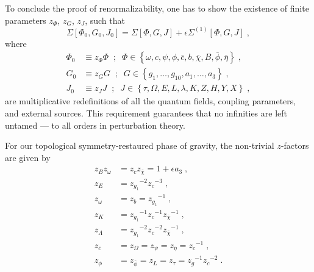 \documentclass[../main.tex]{subfiles}
\begin{document}
To conclude the proof of renormalizability, one has to show the existence of finite parameters $ z_{ \Phi } $, $ z_{ G } $, $ z_{ J } $, such that
\begin{equation}
  \label{eq:multiplicative-renorm}
  \Sigma \left[ \Phi_0, G_0, J_0 \right] = \Sigma \left[ \Phi, G, J \right] + \epsilon\Sigma^{ (1) } \left[ \Phi, G, J \right] \;,
\end{equation}
where
\begin{subequations}%
  \label{eq:field-redef}
  \begin{align}
    \Phi_0 & \equiv z_{ \Phi } \Phi \;\; ; \;\; \Phi \in \left\{ \omega, c, \psi, \phi, \bar{ c }, b, \bar{ \chi }, B, \bar{ \phi }, \bar{ \eta } \right\} \;, \\
    G_0    & \equiv z_{ G } G \;\; ; \;\; G \in \left\{ g_1, \ldots, g_{10}, a_1, \ldots, a_3 \right\} \;,                                                     \\
    J_0    & \equiv z_{ J } J \;\; ; \;\; J \in \left\{ \tau, \Omega, E, L, \lambda, K, Z, H, Y, X \right\} \;,
  \end{align}
\end{subequations}
are multiplicative redefinitions of all the quantum fields, coupling parameters, and external sources. This requirement guarantees that no infinities are left untamed --- to all orders in perturbation theory.

For our topological symmetry-restaured phase of gravity, the non-trivial $z$-factors are given by
\begin{subequations}%
  \label{eq:z-factors}
  \begin{align}
    z_B z_{ \omega } & = z_c z_{\bar{\chi}} = 1 + \epsilon a_3 \;,                \\
    z_E              & = {z_{g_1}}^{-2} {z_c}^{-3} \;,                            \\
    z_{ \omega }     & = z_b = {z_{g_1}}^{-1} \;,                                 \\
    z_K              & = {z_{ g_1 }}^{-1} {z_c}^{-1} {z_{\bar{\chi}}}^{-1} \;,    \\
    z_\Lambda        & = {z_{ g_1 }}^{-2} {z_c}^{-2} {z_{\bar{\chi}}}^{-1} \;,    \\
    z_{\bar{c}}      & = z_\Omega = z_\psi = z_{\bar\eta} = {z_c}^{-1} \;,        \\
    z_\phi           & = z_{\bar{\phi}} = z_L = z_\tau = {z_g}^{-1} {z_c}^{-2}\;.
  \end{align}
\end{subequations}
\end{document}
